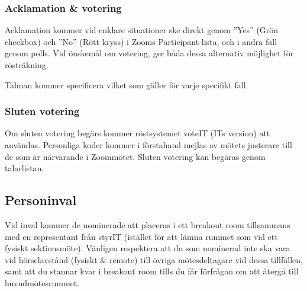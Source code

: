 \documentclass[11pt, noincludeaddress, nopagination]{classes/cthit}
\begin{document}
\begin{adjustwidth}{0.3 cm}{0cm}
\subsubsection*{Acklamation \& votering}
Acklamation kommer vid enklare situationer ske direkt genom ''Yes'' (Grön checkbox) och ''No'' (Rött kryss) i Zooms Participant-lista, och i andra fall genom polls. Vid önskemål om votering, ger båda dessa alternativ möjlighet för rösträkning.
    
Talman kommer specificera vilket som gäller för varje specifikt fall.





\subsubsection*{Sluten votering}
Om sluten votering begärs kommer röstsystemet voteIT (ITs version) att användas. Personliga koder kommer i förstahand mejlas av mötets justerare till de som är närvarande i Zoommötet. Sluten votering kan begäras genom talarlistan.
\end{adjustwidth}

\subsection*{Personinval}
Vid inval kommer de nominerade att placeras i ett breakout room tillsammans med en representant från styrIT (istället för att lämna rummet som vid ett fysiskt sektionsmöte). Vänligen respektera att du som nominerad inte ska vara vid hörselavstånd (fysiskt & remote) till övriga mötesdeltagare vid dessa tillfällen, samt att du stannar kvar i breakout room tills du får förfrågan om att återgå till huvudmötesrummet.
\end{document}
